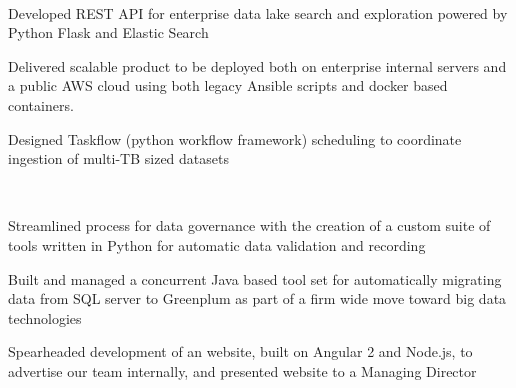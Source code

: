 \documentclass[letterpaper]{deedy-resume-openfont} %
\begin{document}
\begin{minipage}[t]{0.66\textwidth}
\begin{tightitemize}
\end{tightitemize}

\\

\begin{tightitemize}
\item Developed REST API for enterprise data lake search and exploration powered by Python Flask and Elastic Search
\item Delivered scalable product to be deployed both on enterprise internal servers and a public AWS cloud using both legacy
Ansible scripts and docker based containers.
\item Designed Taskflow (python workflow framework) scheduling to coordinate ingestion of multi-TB sized datasets

\end{tightitemize}

\\

\begin{tightitemize}
\item Streamlined process for data governance with the creation of a custom suite of tools written in Python for automatic data validation and recording
\item Built and managed a concurrent Java based tool set for automatically migrating data from SQL server to Greenplum as part of a firm wide move toward big data technologies
\item Spearheaded development of an website, built on Angular 2 and Node.js, to advertise our team internally, and presented website to a Managing Director
\end{tightitemize}



\end{minipage}
\end{document}
